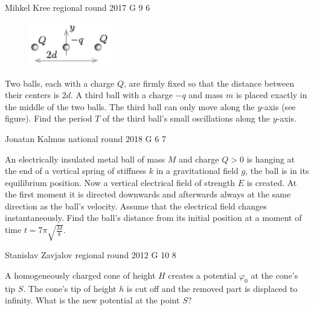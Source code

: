 \documentclass[11pt]{article}
\begin{document}
{Mihkel Kree} %
{regional round} %
{2017} %
{G 9} %
{6} %
{

\ifEngStatement
\begin{figure}
	\vspace{-25pt}
	\begin{center}
		\includegraphics[width=0.32\textwidth]{2017-v2g-09-laengudjoonis}
	\end{center}
	\vspace{-10pt}
\end{figure}
Two balls, each with a charge $Q$, are firmly fixed so that the distance between their centers is $2d$. A third ball with a charge $-q$ and mass $m$ is placed exactly in the middle of the two balls. The third ball can only move along the $y$-axis (see figure). Find the period $T$ of the third ball’s small oscillations along the $y$-axis.
\fi
}

{Jonatan Kalmus} %
{national round} %
{2018} %
{G 6} %
{7} %
{

\ifEngStatement
An electrically insulated metal ball of mass $M$ and charge $Q>0$ is hanging at the end of a vertical spring of stiffness $k$ in a gravitational field $g$, the ball is in its equilibrium position. Now a vertical electrical field of strength $E$ is created. At the first moment it is directed downwards and afterwards always at the same direction as the ball’s velocity. Assume that the electrical field changes instantaneously. Find the ball’s distance from its initial position at a moment of time $t=7\pi \sqrt{\frac{M}{k}}$.
\fi
}

{Stanislav Zavjalov} %
{regional round} %
{2012} %
{G 10} %
{8} %
{

\ifEngStatement
A homogeneously charged cone of height $H$ creates a potential $\varphi_0$ at the cone’s tip $S$. The cone’s tip of height $h$ is cut off and the removed part is displaced to infinity. What is the new potential at the point $S$?
\fi
}
\end{document}
